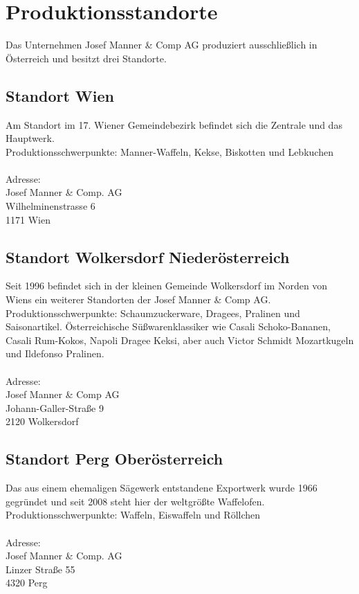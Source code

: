 \section{Produktionsstandorte}
Das Unternehmen Josef Manner \& Comp AG produziert ausschließlich in Österreich und besitzt drei Standorte.

\subsection{Standort Wien}
Am Standort im 17. Wiener Gemeindebezirk befindet sich die Zentrale und das Hauptwerk.\\
Produktionsschwerpunkte: Manner-Waffeln, Kekse, Biskotten und Lebkuchen\\
\\
Adresse:\\
Josef Manner \& Comp. AG\\
Wilhelminenstrasse 6\\
1171 Wien

\subsection{Standort Wolkersdorf Niederösterreich}
Seit 1996 befindet sich in der kleinen Gemeinde Wolkersdorf im Norden von Wiens ein weiterer Standorten der Josef Manner \& Comp AG.\\
Produktionsschwerpunkte: Schaumzuckerware, Dragees, Pralinen und Saisonartikel. Österreichische Süßwarenklassiker wie Casali Schoko-Bananen, Casali Rum-Kokos, Napoli Dragee Keksi, aber auch Victor Schmidt Mozartkugeln und Ildefonso Pralinen.\\
\\
Adresse:\\
Josef Manner \& Comp AG\\
Johann-Galler-Straße 9\\
2120 Wolkersdorf

\subsection{Standort Perg Oberösterreich}
Das aus einem ehemaligen Sägewerk entstandene Exportwerk wurde 1966 gegründet und seit 2008 steht hier der weltgrößte Waffelofen.\\
Produktionsschwerpunkte:  Waffeln, Eiswaffeln und Röllchen\\
\\
Adresse:\\
Josef Manner \& Comp. AG\\
Linzer Straße 55\\
4320 Perg\\
\cite{josef_manner}
